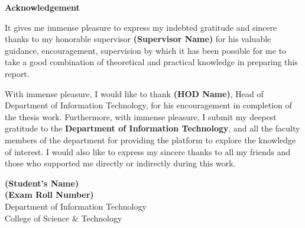 \newpage
\begin{center}
    \textbf{\Large Acknowledgement}
\end{center}

\vspace{1cm}

It gives me immense pleasure to express my indebted gratitude and sincere thanks to my honorable supervisor \textbf{(Supervisor Name)} for his valuable guidance, encouragement, supervision by which it has been possible for me to take a good combination of theoretical and practical knowledge in preparing this report.

With immense pleasure, I would like to thank \textbf{(HOD Name)}, Head of Department of Information Technology, for his encouragement in completion of the thesis work. Furthermore, with immense pleasure, I submit my deepest gratitude to the \textbf{Department of Information Technology}, and all the faculty members of the department for providing the platform to explore the knowledge of interest. I would also like to express my sincere thanks to all my friends and those who supported me directly or indirectly during this work.

\vspace{1cm}

\begin{flushright}
    \textbf{(Student's Name)} \\
    \textbf{(Exam Roll Number)}\\
    Department of Information Technology \\
    College of Science \& Technology \\
\end{flushright}